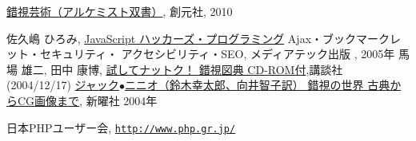 \begin{thebibliography}{99}
				 \href{http://www.amazon.co.jp/%E9%8C%AF%E8%A6%96%E8%8A%B8%E8%A1%93%EF%BC%88%E3%82%A2%E3%83%AB%E3%82%B1%E3%83%9F%E3%82%B9%E3%83%88%E5%8F%8C%E6%9B%B8%EF%BC%89-%E3%83%95%E3%82%A3%E3%83%BC%E3%83%93%E3%83%BB%E3%83%9E%E3%82%AF%E3%83%8E%E3%83%BC%E3%83%88%E3%83%B3/dp/4422214802/ref=sr_1_42?s=books&ie=UTF8&qid=1457336858&sr=1-42&keywords=%E9%8C%AF%E8%A6%96}{錯視芸術（アルケミスト双書）},
				 創元社, 2010
\fi
\iffalse
 \bibitem{Ajax}深津 貴之、増井 雄一郎、川崎 有亮、台場 圭一、WINGSプロジェクト,\\
\href{http://www.amazon.co.jp/exec/obidos/ASIN/4774125792/qid=1149342810/sr=8-2/ref=sr_8_xs_ap_i2_xgl14/249-2928731-2660351}
{Ajax 実装のための基礎テクニック}、技術評論社、2006年
\fi
 佐久嶋 ひろみ,
\href{http://www.amazon.co.jp/exec/obidos/search-handle-url/index=books-jp&field-keywords=javascript/ref=xs_ap_sai1_xgl14/249-2928731-2660351}{JavaScript
	ハッカーズ・プログラミング} Ajax・ブックマークレット・セキュリティ・
	アクセシビリティ・SEO, メディアテック出版 , 2005年
馬場 雄二, 田中 康博,
\href{http://www.amazon.co.jp/%E8%A9%A6%E3%81%97%E3%81%A6%E3%83%8A%E3%83%83%E3%83%88%E3%82%AF%EF%BC%81-%E9%8C%AF%E8%A6%96%E5%9B%B3%E5%85%B8-CD-ROM%E4%BB%98-%E9%A6%AC%E5%A0%B4-%E9%9B%84%E4%BA%8C/dp/4062744082/sr=1-1/qid=1167376185/ref=sr_1_1/503-0729601-8062303?ie=UTF8&s=books}
{試してナットク！ 錯視図典 CD-ROM付},講談社 (2004/12/17)
\href{http://www.amazon.co.jp/錯覚の世界—古典からCG画像まで-ジャック-ニニオ/dp/4788508885/ref=sr_1_2?ie=UTF8&s=books&qid=1206947415&sr=8-2}{ジャック$\bullet$ニニオ（鈴木幸太郎、向井智子訳）
錯視の世界 古典からCG画像まで}, 新曜社 2004年
\iffalse
 \bibitem{HTML5Guide}羽田野 太巳, 白石 俊平, 古籏 一浩 , 太田 昌吾,\\
	 \href{http://www.amazon.co.jp/Google-API-Expert%E3%81%8C%E8%A7%A3%E8%AA%AC%E3%81%99%E3%82%8BHTML5%E3%82%AC%E3%82%A4%E3%83%89%E3%83%96%E3%83%83%E3%82%AF-%E7%BE%BD%E7%94%B0%E9%87%8E-%E5%A4%AA%E5%B7%B3/dp/4844329278/ref=pd_sim_b_2}
{Google API Expertが解説するHTML5ガイドブック}, インプレスジャパン, 2010
\fi
\iffalse
 \bibitem{HTML5SmartPhone}クジラ飛行机 ,
 \href{http://www.amazon.co.jp/%E3%82%B9%E3%83%9E%E3%83%BC%E3%83%88%E3%83%95%E3%82%A9%E3%83%B3%E3%81%AE%E3%81%9F%E3%82%81%E3%81%AEHTML5%E3%82%A2%E3%83%97%E3%83%AA%E3%82%B1%E3%83%BC%E3%82%B7%E3%83%A7%E3%83%B3%E9%96%8B%E7%99%BA%E3%82%AC%E3%82%A4%E3%83%89%E2%80%95iPhone-iPad-Android%E5%AF%BE%E5%BF%9C-%E3%82%AF%E3%82%B8%E3%83%A9%E9%A3%9B%E8%A1%8C%E6%9C%BA/dp/4883377288/ref=pd_sim_b_5}
{スマートフォンのためのHTML5アプリケーション開発ガイド
				 iPhone/iPad/Android対応 }, ソシム, 2010
\fi
 日本PHPユーザー会,
				 \href{http://www.php.gr.jp/}{\texttt{http://www.php.gr.jp/}}
\iffalse
 \bibitem{AWK}A.V.エイホ , P.J.ワインバーガー , B.W.カーニハン ,
				 足立 高徳 (翻訳)
				プログラミング言語AWK, USP研究所, 2010
\fi
\end{thebibliography}

